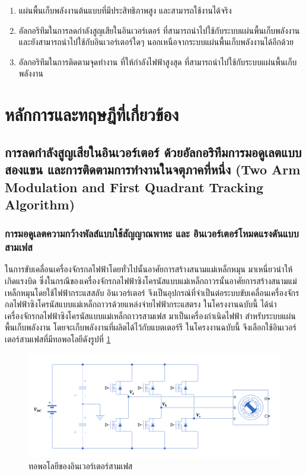 \documentclass[11pt,a4paper]{article}
\begin{document}
\begin{enumerate}
    \item แผ่นพื้นเก็บพลังงานต้นแบบที่มีประสิทธิภาพสูง และสามารถใช้งานได้จริง
    \item อัลกอริทึมในการลดกำลังสูญเสียในอินเวอร์เตอร์ ที่สามารถนำไปใช้กับระบบแผ่นพื้นเก็บพลังงาน และยังสามารถนำไปใช้กับอินเวอร์เตอร์ใดๆ นอกเหนือจากระบบแผ่นพื้นเก็บพลังงานได้อีกด้วย
    \item อัลกอริทึมในการติดตามจุดทำงาน ที่ให้กำลังไฟฟ้าสูงสุด ที่สามารถนำไปใช้กับระบบแผ่นพื้นเก็บพลังงาน
\end{enumerate}

\section{หลักการและทฤษฎีที่เกี่ยวข้อง}

\subsection{การลดกำลังสูญเสียในอินเวอร์เตอร์ ด้วยอัลกอริทึมการมอดูเลตแบบสองแขน และการติดตามการทำงานในจตุภาคที่หนึ่ง (Two Arm Modulation and First Quadrant Tracking Algorithm)}

\subsubsection{การมอดูเลตความกว้างพัลส์แบบใช้สัญญาณพาหะ และ อินเวอร์เตอร์โหมดแรงดันแบบสามเฟส}
ในการขับเคลื่อนเครื่องจักรกลไฟฟ้าโดยทั่วไปนั้นอาศัยการสร้างสนามแม่เหล็กหมุน มาเหนี่ยวนำให้เกิดแรงบิด ซึ่งในกรณีของเครื่องจักรกลไฟฟ้าซิงโครนัสแบบแม่เหล็กถาวรนั้นอาศัยการสร้างสนามแม่เหล็กหมุนโดยใช้ไฟฟ้ากระแสสลับ อินเวอร์เตอร์ จึงเป็นอุปกรณ์ที่จำเป็นต่อระบบขับเคลื่อนเครื่องจักรกลไฟฟ้าซิงโครนัสแบบแม่เหล็กถาวรด้วยแหล่งจ่ายไฟฟ้ากระแสตรง ในโครงงานฉบับนี้ ได้นำเครื่องจักรกลไฟฟ้าซิงโครนัสแบบแม่เหล็กถาวรสามเฟส มาเป็นเครื่องกำเนิดไฟฟ้า สำหรับระบบแผ่นพื้นเก็บพลังงาน โดยจะเก็บพลังงานที่ผลิตได้ไว้กับแบตเตอร์รี ในโครงงานฉบับนี้ จึงเลือกใช้อินเวอร์เตอร์สามเฟสที่มีทอพอโลยีดังรูปที่ \ref{3phaseinv}
\begin{figure}[!h]
    \centering
    \includegraphics[width=\textwidth]{inverter_topology.png}
    \caption{ทอพอโลยีของอินเวอร์เตอร์สามเฟส}
    \label{3phaseinv}
\end{figure}
\end{document}
